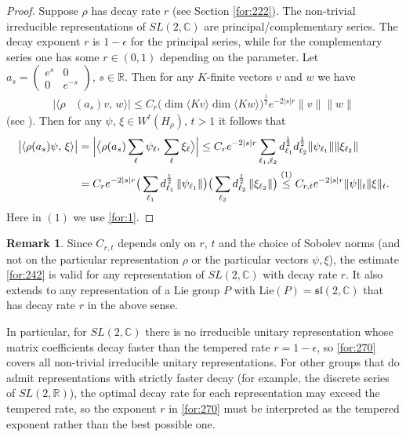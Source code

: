 \documentclass[11 pt]{amsart}
\newcommand{\RR}{\mathbb{R}}
\newcommand{\norm}[1]{\lVert#1\rVert}
\theoremstyle{definition}
\newtheorem{remark}[theorem]{Remark}
\numberwithin{equation}{section}
\def\Lie{\mathrm{Lie}}
\begin{document}
\begin{proof}
Suppose $\rho$ has decay rate $r$ (see Section \ref{for:222}). The non-trivial irreducible representations of $SL(2,\mathbb C)$ are principal/complementary series.
The decay exponent $r$ is $1-\epsilon$ for the principal series, while for
the complementary series one has some $r\in(0,1)$ depending on the parameter. Let $a_s = \begin{pmatrix} e^{s} & 0 \\[5pt]
0 & e^{-s} \end{pmatrix}$, $s\in\RR$. Then for any $K$-finite vectors $v$ and $w$ we have
\begin{align}\label{for:270}
 \big|\langle \rho&(a_s)v,\, w\rangle \big|\leq C_r\big(\dim\langle Kv\rangle\dim\langle Kw\rangle\big)^{\frac{1}{2}} e^{-2|s|r}\norm{v}\norm{w}
\end{align}
(see \cite{Cowling1}). Then for any $\psi,\,\xi\in W^t(H_\rho)$, $t>1$ it follows that
\begin{align}\label{for:242}
 \big|\langle \rho(a_s)\psi,\, \xi\rangle \big|&=\Big| \big\langle \rho(a_s)\sum_{\ell} \psi_\ell,\, \sum_{\ell} \xi_\ell \big\rangle \Big|\leq C_r e^{-2|s|r}\sum_{\ell_1,\ell_2}d_{\ell_1}^{\frac{1}{2}}d_{\ell_2}^{\frac{1}{2}}\norm{\psi_{\ell_1}}\norm{\xi_{\ell_2}}\notag\\
 &= C_r e^{-2|s|r}
    \big(\sum_{\ell_1} d_{\ell_1}^{\frac{1}{2}}\,\|\psi_{\ell_1}\|\big)
    \big(\sum_{\ell_2} d_{\ell_2}^{\frac{1}{2}}\,\|\xi_{\ell_2}\|\big)\overset{\text{(1)}}{\leq} C_{r,t} e^{-2|s|r}\norm{\psi}_t\norm{\xi}_t.
\end{align}
Here in $(1)$ we use \eqref{for:1}.
\end{proof}
\begin{remark}\label{re:13}
Since $C_{r,t}$ depends only on $r$, $t$ and the choice of Sobolev norms (and
not on the particular representation $\rho$ or the particular vectors
$\psi,\xi$), the estimate \eqref{for:242} is valid for any representation
of $SL(2,\mathbb C)$ with decay rate $r$. It also extends to any representation
of a Lie group $P$ with $\Lie(P)=\mathfrak{sl}(2,\mathbb C)$ that has decay
rate $r$ in the above sense.

In particular, for \(SL(2,\mathbb C)\) there is no irreducible unitary representation
whose matrix coefficients decay faster than the tempered rate \(r=1-\epsilon\), so
\eqref{for:270} covers all non-trivial irreducible unitary representations.
For other groups that do admit representations with strictly faster decay (for example,
the discrete series of \(SL(2,\mathbb R)\)), the optimal decay rate for each representation
may exceed the tempered rate, so the exponent \(r\) in \eqref{for:270} must be interpreted
as the tempered exponent rather than the best possible one.
\end{remark}
\end{document}
